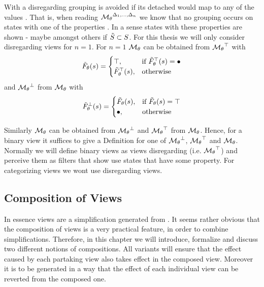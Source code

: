 \documentclass[preview]{standalone}
\begin{document}
With a disregarding \viewN grouping is avoided if its detached \grpfctN would map to any of the values \disregardelements. That is, when reading ${{{{\mathcal{M}}}}_{{\theta}}}^{{{\Delta}_1, \dots, {\Delta}_n}}$ we know that no grouping occurs on states with one of the properties \disregardelements. In a sense states with these properties are shown - maybe amongst others if ${\tilde{{S}}} \subset {S}$. For this thesis we will only consider disregarding views for $n = 1$.  
For $n = 1$ ${{{{\mathcal{M}}}}_{{\theta}}}$ can be obtained from ${{{{\mathcal{M}}}}_{{\theta}}}^{\top}$ with 
\[
{\tilde{F}_{{\theta}}}({s}) = 
\begin{cases}
	{\top},				& \text{if } {\tilde{F}_{\ensuremath{{\theta}}}}^{\top}({s}) = {\bullet}  \\
	{\tilde{F}_{{\theta}}}^{\top}({s}),       		& \text{otherwise }
\end{cases}
\]
and ${{{{\mathcal{M}}}}_{{\theta}}}^{\bot}$ from ${{{{\mathcal{M}}}}_{{\theta}}}$ with
\[
{\tilde{F}_{{\theta}}}^{\bot}({s}) = 
\begin{cases}
	{\tilde{F}_{\ensuremath{{\theta}}}}({s}),       		&\text{if } {\tilde{F}_{\ensuremath{{\theta}}}}({s}) = {\top}  \\ 
	{\bullet},				&\text{otherwise } 
\end{cases}
\]

Similarly ${{{{\mathcal{M}}}}_{{\theta}}}$ can be obtained from ${{{{\mathcal{M}}}}_{{\theta}}}^{\bot}$ and ${{{{\mathcal{M}}}}_{{\theta}}}^{\top}$ from ${{{{\mathcal{M}}}}_{{\theta}}}$. Hence, for a binary view it suffices to give a Definition for one of ${{{{\mathcal{M}}}}_{{\theta}}}^{\bot}$, ${{{{\mathcal{M}}}}_{{\theta}}}^{\top}$ and ${{{{\mathcal{M}}}}_{{\theta}}}$. Normally we will define binary views as views disregarding \hasppty (i.e. ${{{{\mathcal{M}}}}_{{\theta}}}^{\top}$) and perceive them as filters that show use states that have some property. For categorizing views we wont use disregarding views.


\subsection{Composition of Views} \label{ch:composition}
In essence views are a simplification generated from \chgphN. It seems rather obvious that the composition of views is a very practical feature, in order to combine simplifications. Therefore, in this chapter we will introduce, formalize and discuss two different notions of compositions. All variants will ensure that the effect caused by each partaking view also takes effect in the composed view. Moreover it is to be generated in a way that the effect of each individual view can be reverted from the composed one.
\end{document}
